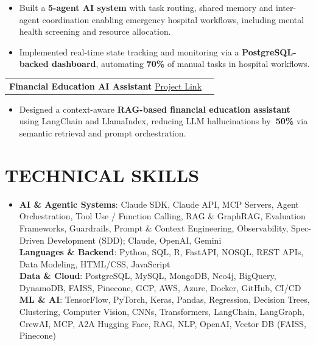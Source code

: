 \documentclass[letterpaper,11pt]{article}
\makeatletter
\newcommand{\resumeItem}[1]{\item\small{#1}}
\newcommand{\resumeProjectHeadingWithLink}[4]{
  \item
  \begin{tabular*}{\linewidth}{l@{\extracolsep{\fill}}r}
    \textbf{#1} \;{\small(\emph{#3})} \;\textbar\; \href{#2}{\underline{Project Link}} & \textbf{#4} \\
  \end{tabular*}
  \vspace{-18pt}
}
\newcommand{\resumeItemListStart}{
  \begin{itemize}[
    leftmargin=20pt,
    topsep=2pt,
    itemsep=2pt,
    parsep=0pt,
    partopsep=0pt
  ]
}
\newcommand{\resumeItemListEnd}{\end{itemize}}
\newcommand{\skillsStart}{
  \begin{itemize}[leftmargin=0in,label={},topsep=0pt,itemsep=0pt,parsep=0pt,partopsep=0pt]
  \item \small
}
\newcommand{\skillsEnd}{
  \end{itemize}\vspace{-2pt}
}
\newcommand{\skillrow}[2]{\textbf{#1}: #2\\}
\makeatother
\begin{document}
        \resumeItemListStart
          \resumeItem{Built a \textbf{5-agent AI system} with task routing, shared memory and inter-agent coordination enabling emergency hospital workflows, including mental health screening and resource allocation.}
          \resumeItem{Implemented real-time state tracking and monitoring via a \textbf{PostgreSQL-backed dashboard}, automating \textbf{70\%} of manual tasks in hospital workflows.}
        \resumeItemListEnd

      \resumeProjectHeadingWithLink
      {Financial Education AI Assistant}
      {https://github.com/AaryanPurohit/Fin_Edu_LLm}
      {Python, Transformers, LangChain, LlamaIndex, Gradio}
      {}

    \resumeItemListStart
      \resumeItem{Designed a context-aware \textbf{RAG-based financial education assistant} using LangChain and LlamaIndex, reducing LLM hallucinations by\textbf{~50\%} via semantic retrieval and prompt orchestration.}
    \resumeItemListEnd





\section{TECHNICAL SKILLS}
\skillsStart
  \skillrow{AI \& Agentic Systems}{Claude SDK, Claude API, MCP Servers, Agent Orchestration, Tool Use / Function Calling, RAG \& GraphRAG, Evaluation Frameworks, Guardrails, Prompt \& Context Engineering, Observability, Spec-Driven Development (SDD); Claude, OpenAI, Gemini}
  \skillrow{Languages \& Backend}{Python, SQL, R, FastAPI, NOSQL, REST APIs, Data Modeling, HTML/CSS, JavaScript}
  \skillrow{Data \& Cloud}{PostgreSQL, MySQL, MongoDB, Neo4j, BigQuery, DynamoDB, FAISS, Pinecone, GCP, AWS, Azure, Docker, GitHub, CI/CD}
  \skillrow{ML \& AI}{TensorFlow, PyTorch, Keras, Pandas, Regression, Decision Trees, Clustering, Computer Vision, CNNs, Transformers, LangChain, LangGraph, CrewAI, MCP, A2A Hugging Face, RAG, NLP, OpenAI, Vector DB (FAISS, Pinecone)}
\skillsEnd
\end{document}
